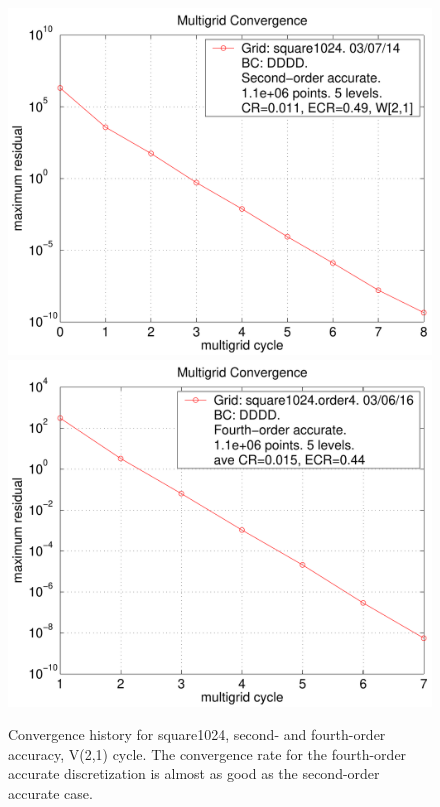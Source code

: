 \documentclass{article}
\begin{document}
\begin{figure}[hbt]
\begin{center}
  \includegraphics[width=.475\linewidth]{fig/residual_square1024}
  \includegraphics[width=.475\linewidth]{fig/residual_square1024_order4}
  \end{center} 
\caption{Convergence history for square1024, second- and fourth-order accuracy, V(2,1) cycle.
The convergence rate for the fourth-order accurate discretization is almost as good as the second-order accurate case.
}
\label{fig:square1024}
\end{figure}




\renewcommand{\tablefontsize}{\footnotesize}
\end{document}
